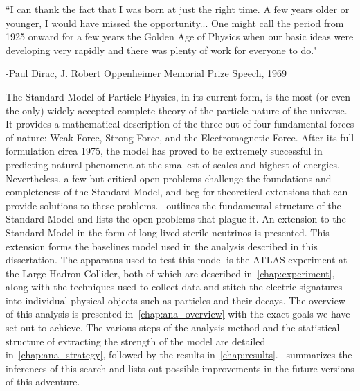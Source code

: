 \vspace{1in}
{\large
``I can thank the fact that I was born at just the right time. A few years older or younger, I would have missed the opportunity... One might call the period from 1925 onward for a few years the Golden Age of Physics when our basic ideas were developing very rapidly and there was plenty of work for everyone to do."

\hfill -Paul Dirac, J. Robert Oppenheimer Memorial Prize Speech, 1969}
\vspace{1in}

The Standard Model of Particle Physics, in its current form, is the most (or even the only) widely accepted complete theory of the particle nature of the universe. It provides a mathematical description of the three out of four fundamental forces of nature: Weak Force, Strong Force, and the Electromagnetic Force. After its full formulation circa 1975, the model has proved to be extremely successful in predicting natural phenomena at the smallest of scales and highest of energies. Nevertheless, a few but critical open problems challenge the foundations and completeness of the Standard Model, and beg for theoretical extensions that can provide solutions to these problems.~ outlines the fundamental structure of the Standard Model and lists the open problems that plague it. An extension to the Standard Model in the form of long-lived sterile neutrinos is presented. This extension forms the baselines model used in the analysis described in this dissertation. The apparatus used to test this model is the ATLAS experiment at the Large Hadron Collider, both of which are described in~\cref{chap:experiment}, along with the techniques used to collect data and stitch the electric signatures into individual physical objects such as particles and their decays. The overview of this analysis is presented in~\cref{chap:ana_overview} with the exact goals we have set out to achieve. The various steps of the analysis method and the statistical structure of extracting the strength of the model are detailed in~\cref{chap:ana_strategy}, followed by the results in~\cref{chap:results}.~ summarizes the inferences of this search and lists out possible improvements in the future versions of this adventure.